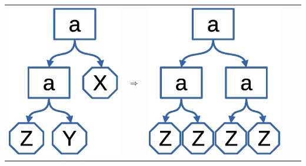 \documentclass{../../slides-style}
\begin{document}
\begin{frame}
\begin{tabular}{m{25mm}cm{25mm}cm{25mm}}
     $\!\!\!\!\!\!$\includegraphics[scale=0.4]{term6.eps} &
    \textbf{\Huge $\Rightarrow$} &
    \pause
    \includegraphics[scale=0.4]{term7.eps}
    \end{tabular}
    \end{frame}
\end{document}
